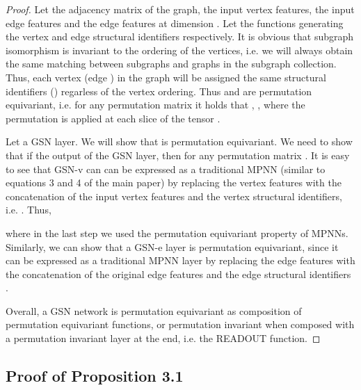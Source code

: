 \documentclass{article} \usepackage{iclr2021_conference,times}
\begin{document}
\begin{proof}
Let  the adjacency matrix of the graph,  the input vertex features,  the input edge features and  the edge features at dimension . Let  the functions generating the vertex and edge structural identifiers respectively. It is obvious that subgraph isomorphism is invariant to the ordering of the vertices, i.e. we will always obtain the same matching between subgraphs  and graphs  in the subgraph collection. Thus, each vertex  (edge ) in the graph will be assigned the same structural identifiers  () regarless of the vertex ordering. Thus  and  are permutation equivariant, i.e. for any permutation matrix  it holds that , , where the permutation is applied at each slice  of the tensor .



Let  a GSN layer. We will show that  is permutation equivariant.  We need to show that if  the output of the GSN layer, then  for any permutation matrix . It is easy to see that GSN-v can can be expressed as a traditional MPNN  (similar to equations 3 and 4 of the main paper) by replacing the vertex features  with the concatenation of the input vertex features and the vertex structural identifiers, i.e. . Thus, 


where in the last step we used the permutation equivariant property of MPNNs. Similarly, we can show that a GSN-e layer is permutation equivariant, since it can be expressed as a traditional MPNN layer by replacing the edge features with the concatenation of the original edge features and the edge structural identifiers .

Overall, a GSN network is permutation equivariant as composition of permutation equivariant functions, or permutation invariant when composed with a permutation invariant layer at the end, i.e. the READOUT function.

\end{proof}

\subsection{Proof of Proposition 3.1}\label{proof}
\end{document}
